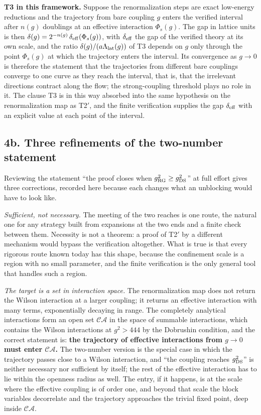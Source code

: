 \documentclass[11pt,a4paper]{article}
\begin{document}
\textbf{T3 in this framework.} Suppose the renormalization steps are
exact low-energy reductions and the trajectory from bare coupling \(g\)
enters the verified interval after \(n(g)\) doublings at an effective
interaction \(\Phi_s(g)\). The gap in lattice units is then
\(\delta(g)=2^{-n(g)}\,\delta_{\rm eff}(\Phi_s(g))\), with
\(\delta_{\rm eff}\) the gap of the verified theory at its own scale,
and the ratio \(\delta(g)/(a\Lambda_{\rm lat}(g))\) of T3 depends on
\(g\) only through the point \(\Phi_s(g)\) at which the trajectory
enters the interval. Its convergence as \(g\to0\) is therefore the
statement that the trajectories from different bare couplings converge
to one curve as they reach the interval, that is, that the irrelevant
directions contract along the flow; the strong-coupling threshold plays
no role in it. The clause T3 is in this way absorbed into the same
hypothesis on the renormalization map as T2\('\), and the finite
verification supplies the gap \(\delta_{\rm eff}\) with an explicit
value at each point of the interval.

\subsection{4b. Three refinements of the two-number
statement}\label{b.-three-refinements-of-the-two-number-statement}

Reviewing the statement ``the proof closes when
\(g_{\rm RG}^2\ge g_{\rm DS}^2\)'' at full effort gives three
corrections, recorded here because each changes what an unblocking would
have to look like.

\emph{Sufficient, not necessary.} The meeting of the two reaches is one
route, the natural one for any strategy built from expansions at the two
ends and a finite check between them. Necessity is not a theorem: a
proof of T2\('\) by a different mechanism would bypass the verification
altogether. What is true is that every rigorous route known today has
this shape, because the confinement scale is a region with no small
parameter, and the finite verification is the only general tool that
handles such a region.

\emph{The target is a set in interaction space.} The renormalization map
does not return the Wilson interaction at a larger coupling; it returns
an effective interaction with many terms, exponentially decaying in
range. The completely analytical interactions form an open set
\(\mathcal{CA}\) in the space of summable interactions, which contains
the Wilson interactions at \(g^2>444\) by the Dobrushin condition, and
the correct statement is: \textbf{the trajectory of effective
interactions from \(g\to0\) must enter \(\mathcal{CA}\).} The two-number
version is the special case in which the trajectory passes close to a
Wilson interaction, and ``the coupling reaches \(g_{\rm DS}^2\)'' is
neither necessary nor sufficient by itself; the rest of the effective
interaction has to lie within the openness radius as well. The entry, if
it happens, is at the scale where the effective coupling is of order
one, and beyond that scale the block variables decorrelate and the
trajectory approaches the trivial fixed point, deep inside
\(\mathcal{CA}\).
\end{document}

